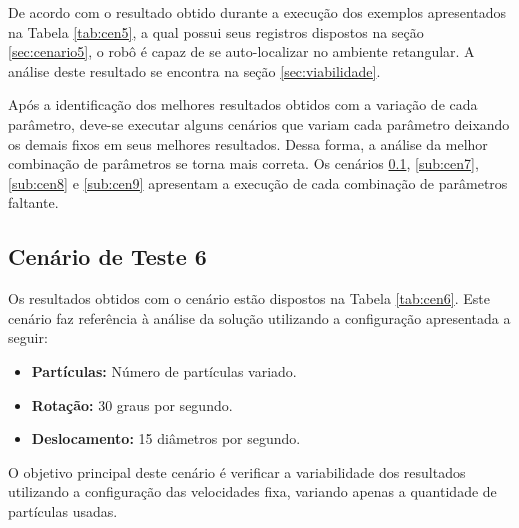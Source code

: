 De acordo com o resultado obtido durante a execução dos exemplos apresentados na Tabela \ref{tab:cen5}, a qual possui seus registros
dispostos na seção \ref{sec:cenario5}, o robô é capaz de se auto-localizar no ambiente retangular. A análise deste resultado se encontra
na seção \ref{sec:viabilidade}.

Após a identificação dos melhores resultados obtidos com a variação de cada parâmetro, deve-se executar alguns cenários que variam
cada parâmetro deixando os demais fixos em seus melhores resultados. Dessa forma, a análise da melhor combinação de parâmetros se torna
mais correta. Os cenários \ref{sub:cen6}, \ref{sub:cen7}, \ref{sub:cen8} e \ref{sub:cen9} apresentam a execução de cada combinação
de parâmetros faltante.

\subsection{Cenário de Teste 6}
\label{sub:cen6}

Os resultados obtidos com o cenário estão dispostos na Tabela \ref{tab:cen6}. Este cenário faz referência à análise da solução
utilizando a configuração apresentada a seguir:

\begin{itemize}
  \item \textbf{Partículas:} Número de partículas variado.
  \item \textbf{Rotação:} 30 graus por segundo.
  \item \textbf{Deslocamento:} 15 diâmetros por segundo.
\end{itemize}

O objetivo principal deste cenário é verificar a variabilidade dos resultados utilizando a configuração das velocidades fixa, variando
apenas a quantidade de partículas usadas.

